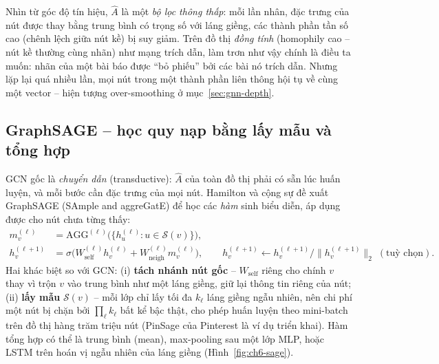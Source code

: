 
Nhìn từ góc độ tín hiệu, $\hat A$ là một \emph{bộ lọc thông thấp}: mỗi lần nhân, đặc trưng của nút được thay bằng
trung bình có trọng số với láng giềng, các thành phần tần số cao (chênh lệch giữa nút kề) bị suy giảm. Trên đồ thị
\emph{đồng tính} (homophily cao -- nút kề thường cùng nhãn) như mạng trích dẫn, làm trơn như vậy chính là điều ta
muốn: nhãn của một bài báo được ``bỏ phiếu'' bởi các bài nó trích dẫn. Nhưng lặp lại quá nhiều lần, mọi nút trong một
thành phần liên thông hội tụ về cùng một vector -- hiện tượng over-smoothing ở mục~\ref{sec:gnn-depth}.

\subsection{GraphSAGE -- học quy nạp bằng lấy mẫu và tổng hợp}
\label{sec:gnn-sage}

GCN gốc là \emph{chuyển dẫn} (transductive): $\hat A$ của toàn đồ thị phải có sẵn lúc huấn luyện, và mỗi bước cần đặc
trưng của mọi nút. Hamilton và cộng sự \cite{ch6:hamilton2017} đề xuất GraphSAGE (SAmple and aggreGatE) để học các
\emph{hàm} sinh biểu diễn, áp dụng được cho nút chưa từng thấy:
\begin{align}
  m_v^{(\ell)} &= \mathrm{AGG}^{(\ell)}\big(\{h_u^{(\ell)} : u\in\mathcal S(v)\}\big),\\
  h_v^{(\ell+1)} &= \sigma\big(W_{\text{self}}^{(\ell)}h_v^{(\ell)} + W_{\text{neigh}}^{(\ell)}m_v^{(\ell)}\big),
  \qquad h_v^{(\ell+1)}\leftarrow h_v^{(\ell+1)}/\lVert h_v^{(\ell+1)}\rVert_2 \;(\text{tuỳ chọn}).
\end{align}
Hai khác biệt so với GCN: (i) \textbf{tách nhánh nút gốc} -- $W_{\text{self}}$ riêng cho chính $v$ thay vì trộn $v$
vào trung bình như một láng giềng, giữ lại thông tin riêng của nút; (ii) \textbf{lấy mẫu} $\mathcal S(v)$ -- mỗi lớp
chỉ lấy tối đa $k_\ell$ láng giềng ngẫu nhiên, nên chi phí một nút bị chặn bởi $\prod_\ell k_\ell$ bất kể bậc thật, cho
phép huấn luyện theo mini-batch trên đồ thị hàng trăm triệu nút (PinSage của Pinterest \cite{ch6:ying2018pinsage} là ví
dụ triển khai). Hàm tổng hợp có thể là trung bình (mean), max-pooling sau một lớp MLP, hoặc LSTM trên hoán vị ngẫu
nhiên của láng giềng (Hình~\ref{fig:ch6-sage}).


